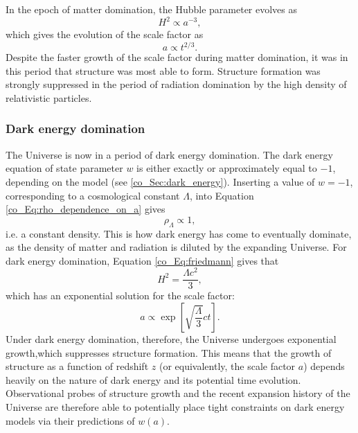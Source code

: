 In the epoch of matter domination, the Hubble parameter evolves as
\begin{equation}
H^2 \propto a^{-3},
\end{equation}
which gives the evolution of the scale factor as
\begin{equation}
a \propto t^{2/3}.
\end{equation}
Despite the faster growth of the scale factor during matter domination, it was in this period that structure was most able to form. Structure formation was strongly suppressed in the period of radiation domination by the high density of relativistic particles.

\subsubsection{Dark energy domination}
\label{co_Sec:de_domination}

The Universe is now in a period of dark energy domination. The dark energy equation of state parameter $w$ is either exactly or approximately equal to $-1$, depending on the model (see \autoref{co_Sec:dark_energy}). Inserting a value of $w = -1$, corresponding to a cosmological constant $\Lambda$, into Equation \eqref{co_Eq:rho_dependence_on_a} gives
\begin{equation}
\rho_\Lambda \propto 1,
\end{equation}
i.e. a constant density. This is how dark energy has come to eventually dominate, as the density of matter and radiation is diluted by the expanding Universe. For dark energy domination, Equation \eqref{co_Eq:friedmann} gives that
\begin{equation}
H^2 = \frac{\Lambda c^2}{3},
\end{equation}
which has an exponential solution for the scale factor:
\begin{equation}
a \propto \exp{\left[ \sqrt{\frac{\Lambda}{3}} c t \right]}.
\end{equation}
Under dark energy domination, therefore, the Universe undergoes exponential growth,\linebreak which suppresses structure formation. This means that the growth of structure as a function of redshift $z$ (or equivalently, the scale factor $a$) depends heavily on the nature of dark energy and its potential time evolution. Observational probes of structure growth and the recent expansion history of the Universe are therefore able to potentially place tight constraints on dark energy models via their predictions of $w \left( a \right)$.

